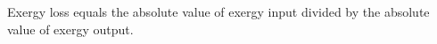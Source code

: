 Exergy loss equals the absolute value of exergy input divided by the absolute value of exergy output.